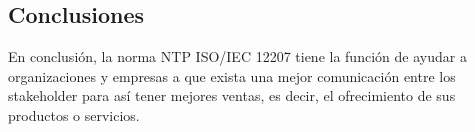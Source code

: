 \documentclass{article}
\begin{document}
\pagebreak
\subsection{Conclusiones}\label{sec:conclusiones}
En conclusión, la norma NTP ISO/IEC 12207 tiene la función de ayudar a
organizaciones y empresas a que exista una mejor comunicación entre los
stakeholder para así tener mejores ventas, es decir, el ofrecimiento de sus
productos o servicios.

%

\nocite{*}

%
\end{document}
